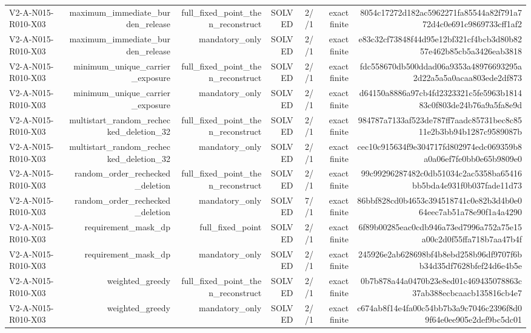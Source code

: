 {\begin{longtable}{lrrrrrr}
V2-A-N015-R010-X03 & maximum\_immediate\_burden\_release & full\_fixed\_point\_then\_reconstruct & SOLVED & 2//1 & exact finite & 8054c17272d182ac5962271fa85544a82f791a772d4c0e691c9869733cff1af2 \\
V2-A-N015-R010-X03 & maximum\_immediate\_burden\_release & mandatory\_only & SOLVED & 2//1 & exact finite & e83c32cf73848f44d95e12bf321cf4bcb3d80b8257e462b85cb5a3426eab3818 \\
V2-A-N015-R010-X03 & minimum\_unique\_carrier\_exposure & full\_fixed\_point\_then\_reconstruct & SOLVED & 2//1 & exact finite & fdc558670db500ddad06a9353a48976693295a2d22a5a5a0acaa803ede2df873 \\
V2-A-N015-R010-X03 & minimum\_unique\_carrier\_exposure & mandatory\_only & SOLVED & 2//1 & exact finite & d64150a8886a97cb4fd2323321c5fe5963b181483c0f803de24b76a9a5fa8e9d \\
V2-A-N015-R010-X03 & multistart\_random\_rechecked\_deletion\_32 & full\_fixed\_point\_then\_reconstruct & SOLVED & 2//1 & exact finite & 984787a7133af523de787ff7aadc85731bec8c8511e2b3bb94b1287c9589087b \\
V2-A-N015-R010-X03 & multistart\_random\_rechecked\_deletion\_32 & mandatory\_only & SOLVED & 2//1 & exact finite & cec10c915634f9e304717fd802974edc069359b8a0a06ef7fe0bb0e65b9809e0 \\
V2-A-N015-R010-X03 & random\_order\_rechecked\_deletion & full\_fixed\_point\_then\_reconstruct & SOLVED & 2//1 & exact finite & 99c99296287482c0db51034c2ac5358ba65416bb5bda4e931f0b037fade11d73 \\
V2-A-N015-R010-X03 & random\_order\_rechecked\_deletion & mandatory\_only & SOLVED & 7//1 & exact finite & 86bbf828cd0b4653c394518741c0e82b3d4b0e064eec7ab51a78e90f1a4a4290 \\
V2-A-N015-R010-X03 & requirement\_mask\_dp & full\_fixed\_point & SOLVED & 2//1 & exact finite & 6f89b00285eac0cdb946a73ed7996a752a75e15a00c2d0f55ffa718b7aa47b4f \\
V2-A-N015-R010-X03 & requirement\_mask\_dp & mandatory\_only & SOLVED & 2//1 & exact finite & 245926e2ab628698bf4b8ebd258b96df9707f6bb34d35df7628bfef24d6e4b5e \\
V2-A-N015-R010-X03 & weighted\_greedy & full\_fixed\_point\_then\_reconstruct & SOLVED & 2//1 & exact finite & 0b7b878a44a0470b23e8ed01c469435078863c37ab388ecbcaacb135816cb4e7 \\
V2-A-N015-R010-X03 & weighted\_greedy & mandatory\_only & SOLVED & 2//1 & exact finite & c674ab8f14e4fa00c54bb7b3a9c7046c2396f8d09f64e0ee905e2def9bc5dc01 \\

\end{longtable}}
